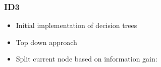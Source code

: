 \begin{frame}
\frametitle{ID3}
\begin{itemize}
\item Initial implementation of decision trees
\item Top down approach
\item Split current node based on information gain:

\end{itemize}
\end{frame}